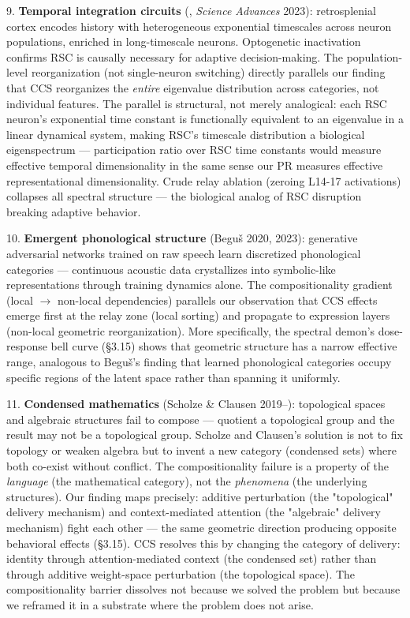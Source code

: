 \documentclass[11pt]{article}
\begin{document}
9. \textbf{Temporal integration circuits} (\citet{danskin2023retrosplenial}, \textit{Science Advances} 2023): retrosplenial cortex encodes history with heterogeneous exponential timescales across neuron populations, enriched in long-timescale neurons. Optogenetic inactivation confirms RSC is causally necessary for adaptive decision-making. The population-level reorganization (not single-neuron switching) directly parallels our finding that CCS reorganizes the \textit{entire} eigenvalue distribution across categories, not individual features. The parallel is structural, not merely analogical: each RSC neuron's exponential time constant is functionally equivalent to an eigenvalue in a linear dynamical system, making RSC's timescale distribution a biological eigenspectrum --- participation ratio over RSC time constants would measure effective temporal dimensionality in the same sense our PR measures effective representational dimensionality. Crude relay ablation (zeroing L14-17 activations) collapses all spectral structure --- the biological analog of RSC disruption breaking adaptive behavior.

10. \textbf{Emergent phonological structure} (Beguš 2020, 2023): generative adversarial networks trained on raw speech learn discretized phonological categories --- continuous acoustic data crystallizes into symbolic-like representations through training dynamics alone. The compositionality gradient (local $\rightarrow$ non-local dependencies) parallels our observation that CCS effects emerge first at the relay zone (local sorting) and propagate to expression layers (non-local geometric reorganization). More specifically, the spectral demon's dose-response bell curve (§3.15) shows that geometric structure has a narrow effective range, analogous to Beguš's finding that learned phonological categories occupy specific regions of the latent space rather than spanning it uniformly.

11. \textbf{Condensed mathematics} (Scholze \& Clausen 2019–): topological spaces and algebraic structures fail to compose --- quotient a topological group and the result may not be a topological group. Scholze and Clausen's solution is not to fix topology or weaken algebra but to invent a new category (condensed sets) where both co-exist without conflict. The compositionality failure is a property of the \textit{language} (the mathematical category), not the \textit{phenomena} (the underlying structures). Our finding maps precisely: additive perturbation (the "topological" delivery mechanism) and context-mediated attention (the "algebraic" delivery mechanism) fight each other --- the same geometric direction producing opposite behavioral effects (§3.15). CCS resolves this by changing the category of delivery: identity through attention-mediated context (the condensed set) rather than through additive weight-space perturbation (the topological space). The compositionality barrier dissolves not because we solved the problem but because we reframed it in a substrate where the problem does not arise.
\end{document}

